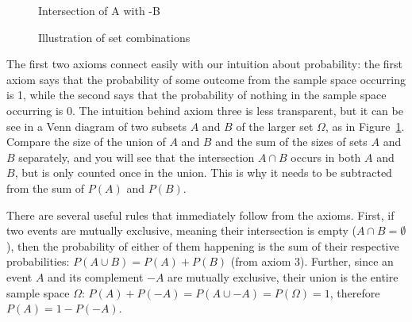 \documentclass[
  letterpaper,
  DIV=11,
  numbers=noendperiod]{scrreprt}
\begin{document}
\begin{figure}
\begin{minipage}[t]{0.33\linewidth}
\end{minipage}%
%
\begin{minipage}[t]{0.33\linewidth}

{\centering 


\caption{Intersection of A with -B}

}

\end{minipage}%

\caption{\label{fig-sets-prob}Illustration of set combinations}

\end{figure}

The first two axioms connect easily with our intuition about
probability: the first axiom says that the probability of some outcome
from the sample space occurring is 1, while the second says that the
probability of nothing in the sample space occurring is 0. The intuition
behind axiom three is less transparent, but it can be see in a Venn
diagram of two subsets \(A\) and \(B\) of the larger set \(\Omega\), as
in Figure~\ref{fig-sets-prob}. Compare the size of the union of \(A\)
and \(B\) and the sum of the sizes of sets \(A\) and \(B\) separately,
and you will see that the intersection \(A\cap B\) occurs in both \(A\)
and \(B\), but is only counted once in the union. This is why it needs
to be subtracted from the sum of \(P(A)\) and \(P(B)\).

There are several useful rules that immediately follow from the axioms.
First, if two events are mutually exclusive, meaning their intersection
is empty (\(A\cap B = \emptyset\)), then the probability of either of
them happening is the sum of their respective probabilities:
\(P(A \cup B) = P(A) + P(B)\) (from axiom 3). Further, since an event
\(A\) and its complement \(-A\) are mutually exclusive, their union is
the entire sample space \(\Omega\):
\(P(A) + P(-A) = P(A \cup -A) = P(\Omega) = 1\), therefore
\(P(A) = 1-P(-A)\).
\end{document}
